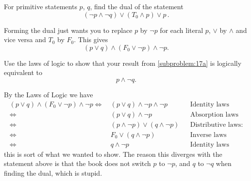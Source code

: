 \documentclass[a4paper, english, 12pt]{article} %
\begin{document}

\begin{problem}[7]
  \begin{subproblem}
    \label{subproblem:17a}
    For primitive statements $p$, $q$, find the dual of the statement
    \begin{equation*}
      (\neg p \wedge \neg q) \vee (T_0 \wedge p) \vee p\,. 
    \end{equation*}
  \end{subproblem}
\end{problem}

\begin{answer}
  Forming the dual just wants you to replace $p$ by $\neg p$ for each literal
  $p$, $\vee$ by $\wedge$ and vice versa and $T_0$ by $F_0$. This gives
  \begin{equation*}
    (p \vee q) \wedge (F_0 \vee \neg p) \wedge \neg p.
  \end{equation*}
\end{answer}

\begin{subproblem}
  Use the laws of logic to show that your result from \cref{subproblem:17a} is
  logically equivalent to
  \begin{equation*}
    p \wedge \neg q.
  \end{equation*}
\end{subproblem} 

\begin{answer}
  By the Laws of Logic we have
  \begin{align*}
                          (p \vee q) \wedge (F_0 \vee \neg p) \wedge \neg p 
    \Leftrightarrow \ & (p \vee q) \wedge \neg p \wedge \neg p
    && \text{Identity laws}\\
    \Leftrightarrow \ & (p \vee q) \wedge \neg p
    && \text{Absorption laws}\\
    \Leftrightarrow \ & (p \wedge \neg p) \vee (q \wedge \neg p)
    && \text{Distributive laws:}\\
    \Leftrightarrow \ & F_0 \vee (q \wedge \neg p)
    && \text{Inverse laws}\\
    \Leftrightarrow \ & q \wedge \neg p 
    && \text{Identity laws}
  \end{align*}
  this is sort of what we wanted to show. The reason this diverges with the
  statement above is that the book does not switch $p$ to $\neg p$, and $q$ to
  $\neg q$ when finding the dual, which is stupid. 
\end{answer}
\end{document}
